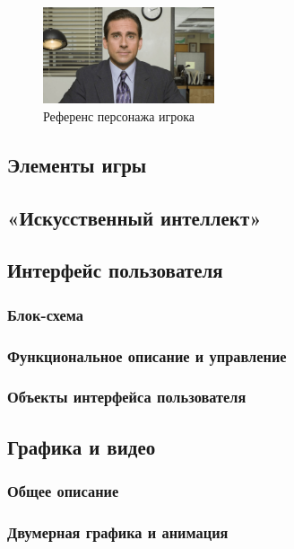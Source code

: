 \documentclass{article}
\begin{document}
	\begin{figure}[h]
		\centering
		\includegraphics[width=0.45\textwidth]{images/main.jpg}
		\caption{Референс персонажа игрока}
		\label{fig:otherworld}
	\end{figure}
        
	\newpage
	\subsection{Элементы игры}
	
	\subsection{«Искусственный интеллект»}
	
	\subsection{Интерфейс пользователя}
	
	\subsubsection{Блок-схема}
	
	\subsubsection{Функциональное описание и управление}
	
	\subsubsection{Объекты интерфейса пользователя}
	
	\subsection{Графика и видео}
	
	\subsubsection{Общее описание}
	
	\subsubsection{Двумерная графика и анимация}
	
\end{document}
